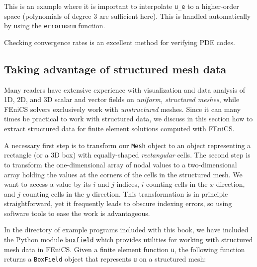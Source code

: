 \documentclass[graybox,envcountchap,sectrefs,final]{svmonodo}
\begin{document}
\noindent
This is an example where it is important to interpolate \Verb!u_e! to a
higher-order space (polynomials of degree 3 are sufficient here). This
is handled automatically by using the \texttt{errornorm} function.


Checking convergence rates is an excellent method for verifying PDE
codes.

\subsection{Taking advantage of structured mesh data}
\label{ftut:structviz}

Many readers have extensive experience with visualization and data
analysis of 1D, 2D, and 3D scalar and vector fields on \emph{uniform,
structured meshes}, while FEniCS solvers exclusively work with
\emph{unstructured} meshes. Since it can many times be practical to
work with structured data, we discuss in this section how to
extract structured data for finite element solutions computed with
FEniCS.


A necessary first step is to transform our \texttt{Mesh} object to an object
representing a rectangle (or a 3D box) with equally-shaped
\emph{rectangular} cells.  The second step is to transform the
one-dimensional array of nodal values to a two-dimensional array
holding the values at the corners of the cells in the structured
mesh. We want to access a value by its $i$ and $j$ indices, $i$
counting cells in the $x$ direction, and $j$ counting cells in the $y$
direction.  This transformation is in principle straightforward, yet
it frequently leads to obscure indexing errors, so using software
tools to ease the work is advantageous.

In the directory of example programs included with this book, we have
included the Python module
\href{{https://fenicsproject.org/pub/tutorial/python/vol1/boxfield.py}}{\nolinkurl{boxfield}}
which provides utilities for working with structured mesh data in
FEniCS. Given a finite element function \texttt{u}, the following function
returns a \texttt{BoxField} object that represents \texttt{u} on a structured mesh:
\end{document}
